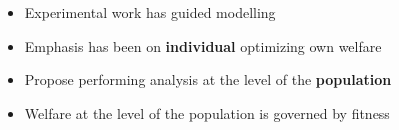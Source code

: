 \pause

\begin{itemize}
    \item Experimental work has guided modelling\pause
    \item Emphasis has been on \textbf{individual} optimizing own welfare\pause
\end{itemize}
\bigskip

\bigskip

\begin{itemize}
    \item Propose performing analysis at the level of the \textbf{population} \pause
    \item Welfare at the level of the population is governed by fitness 
\end{itemize}
\bigskip





